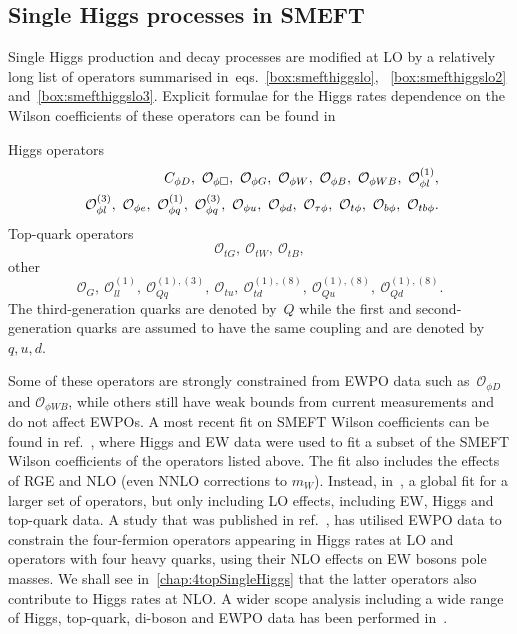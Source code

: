 \subsection{Single Higgs processes in SMEFT}
Single Higgs production and decay processes are modified at LO by a relatively long list of operators summarised in~eqs.~\eqref{box:smefthiggslo}, ~\eqref{box:smefthiggslo2} and~\eqref{box:smefthiggslo3}. Explicit formulae for the Higgs rates dependence on the Wilson coefficients of these operators can be found in~\cite{ATLAS:2019dhi}
\begin{tcolorbox}[title=SMEFT operators modifying Higgs rates at LO,
	title filled=false,
	colback=Mahogany!5!white,
	colframe=Mahogany ]
	Higgs operators
	\begin{align}
		C_{\phi D}, \ \mathcal{O}_{\phi \Box},\ \mathcal{O}_{\phi G}, \ \mathcal{O}_{\phi W},\ \mathcal{O}_{\phi B}, \ \mathcal{O}_{\phi W B},\ \mathcal{O}_{\phi l}^{(1)}, \nn \\
		\ \mathcal{O}_{\phi l}^{(3)}, \ \mathcal{O}_{\phi e},\ \mathcal{O}_{\phi q}^{(1)},\ \mathcal{O}_{\phi q}^{(3)}, \  \mathcal{O}_{\phi u}, \ \mathcal{O}_{\phi d},\ \mathcal{O}_{\tau \phi}, \ \mathcal{O}_{t \phi}, \ \mathcal{O}_{b \phi},\ \mathcal{O}_{tb \phi}.
		\label{box:smefthiggslo}
	\end{align}
	Top-quark operators
	\begin{equation}
		\mathcal{O}_{t G}, \ \mathcal{O}_{t W}, \ \mathcal{O}_{t B},
		\label{box:smefthiggslo2}
	\end{equation}
	other 
	\begin{equation}
		\mathcal{O}_G,\ \mathcal{O}_{ll}^{(1)},\ \mathcal{O}_{Qq}^{(1),(3)},\ \mathcal{O}_{tu},\ \mathcal{O}_{td}^{(1),(8)},\ \mathcal{O}_{Qu}^{(1),(8)}, \ \mathcal{O}_{Qd}^{(1),(8)}.
		\label{box:smefthiggslo3}
	\end{equation}
	The third-generation quarks are denoted by~$Q$ while the first and second-generation quarks are assumed to have the same coupling and are denoted by $q,u,d$.
\end{tcolorbox}
Some of these operators are strongly constrained from EWPO data such as~$\mathcal{O}_{\phi D}$ and $ \mathcal{O}_{\phi W B}$, while others still have weak bounds from current measurements and do not affect EWPOs. A most recent fit on SMEFT Wilson coefficients can be found in ref.~\cite{Dawson:2020oco}, where Higgs and EW data were used to fit a subset of the SMEFT Wilson coefficients of the operators listed above. The fit also includes the effects of RGE and NLO (even NNLO corrections to $m_W$). Instead, in~\cite{Ethier:2021bye}, a global fit for a larger set of operators, but only including LO effects, including EW, Higgs and top-quark data.  A study that was published in ref.~\cite{Dawson:2022bxd}, has utilised EWPO data to constrain the four-fermion operators appearing in Higgs rates at LO and operators with four heavy quarks, using their NLO effects on EW bosons pole masses. We shall see in~\autoref{chap:4topSingleHiggs} that the latter operators also contribute to Higgs rates at NLO. A wider scope analysis including a wide range of Higgs, top-quark, di-boson and EWPO data has been performed in~\cite{Ellis:2020unq}. 
